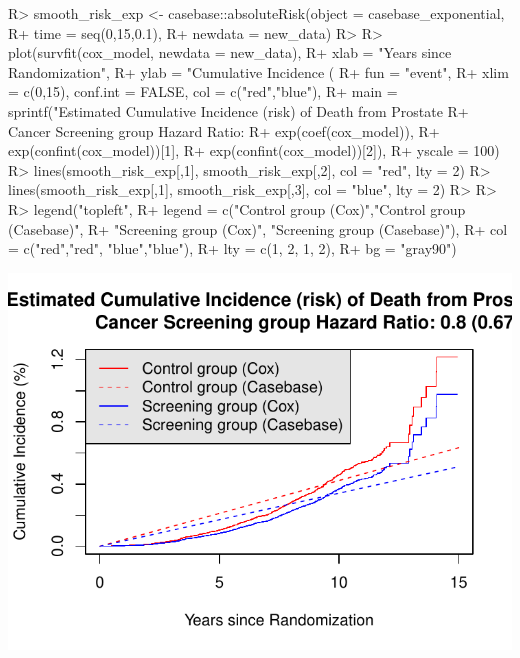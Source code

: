 \documentclass[
]{jss}
\begin{document}
\begin{CodeChunk}

\begin{CodeInput}
R> smooth_risk_exp <- casebase::absoluteRisk(object = casebase_exponential, 
R+                                           time = seq(0,15,0.1), 
R+                                           newdata = new_data)
R> 
R> plot(survfit(cox_model, newdata = new_data),
R+      xlab = "Years since Randomization", 
R+      ylab = "Cumulative Incidence (%
R+      fun = "event",
R+      xlim = c(0,15), conf.int = FALSE, col = c("red","blue"), 
R+      main = sprintf("Estimated Cumulative Incidence (risk) of Death from Prostate 
R+                     Cancer Screening group Hazard Ratio: %
R+                     exp(coef(cox_model)), 
R+                     exp(confint(cox_model))[1], 
R+                     exp(confint(cox_model))[2]),
R+      yscale = 100)
R> lines(smooth_risk_exp[,1], smooth_risk_exp[,2], col = "red", lty = 2)
R> lines(smooth_risk_exp[,1], smooth_risk_exp[,3], col = "blue", lty = 2)
R> 
R> 
R> legend("topleft", 
R+        legend = c("Control group (Cox)","Control group (Casebase)",
R+                   "Screening group (Cox)", "Screening group (Casebase)"), 
R+        col = c("red","red", "blue","blue"),
R+        lty = c(1, 2, 1, 2), 
R+        bg = "gray90")
\end{CodeInput}


\begin{center}\includegraphics{../figures/erspc-casebase-cif-1} \end{center}

\end{CodeChunk}
\end{document}
